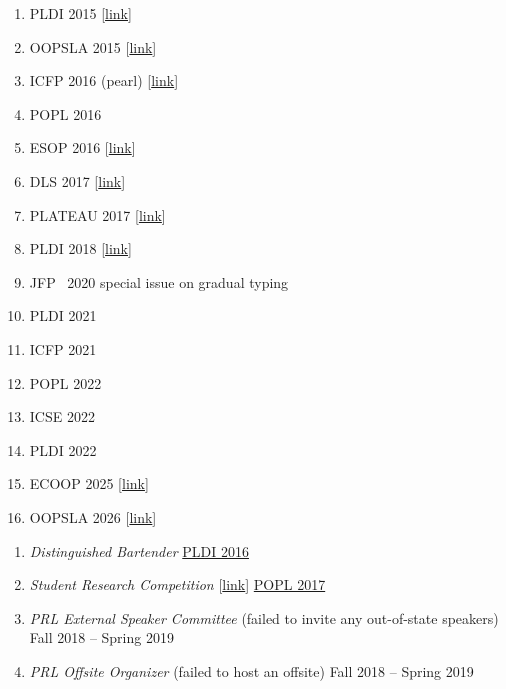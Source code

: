 \documentclass{article}
\begin{document}
\begin{enumerate}
\item PLDI 2015 [\href{https://cs.utah.edu/~blg/cv/failures/pldi-2015-reject.pdf}{link}]
\item OOPSLA 2015 [\href{https://cs.utah.edu/~blg/cv/failures/oopsla-2015-reject.pdf}{link}]
\item ICFP 2016 (pearl) [\href{https://cs.utah.edu/~blg/cv/failures/icfp-2016-reject.pdf}{link}]
\item POPL 2016
\item ESOP 2016 [\href{https://cs.utah.edu/~blg/resources/type-tailoring.pdf}{link}]
\item DLS 2017 [\href{https://cs.utah.edu/~blg/resources/dls-2017-reject.pdf}{link}]
\item PLATEAU 2017 [\href{https://cs.utah.edu/~blg/cv/failures/plateau-2017-reject.pdf}{link}]
\item PLDI 2018 [\href{https://cs.utah.edu/~blg/cv/failures/pldi-2018-reject.pdf}{link}]
\item JFP ~2020 special issue on gradual typing
\item PLDI 2021 %
\item ICFP 2021 %
\item POPL 2022 %
\item ICSE 2022 %
\item PLDI 2022 %
\item ECOOP 2025 [\href{https://cs.utah.edu/~blg/cv/failures/ecoop-2025-reject.pdf}{link}]
\item OOPSLA 2026 [\href{https://cs.utah.edu/~blg/cv/failures/oopsla-2026-reject.pdf}{link}]
\end{enumerate}

\begin{enumerate}
\item \emph{Distinguished Bartender} \hfill \href{http://conf.researchr.org/home/PLDI-2016}{PLDI 2016}
\item \emph{Student Research Competition} [\href{https://cs.utah.edu/~blg/failures/src-2017-reject.pdf}{link}] \hfill \href{https://popl17.sigplan.org/track/POPL-2017-src}{POPL 2017}
\item \emph{PRL External Speaker Committee} (failed to invite any out-of-state speakers)  \hfill {Fall 2018 -- Spring 2019}
\item \emph{PRL Offsite Organizer} (failed to host an offsite) \hfill {Fall 2018 -- Spring 2019}
\end{enumerate}
\end{document}
